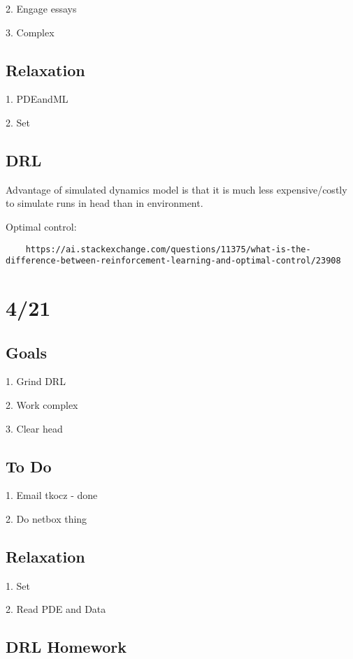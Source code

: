 \documentclass[11pt]{article}
\theoremstyle{remark}
\begin{document}
2. Engage essays

3. Complex

\subsection{Relaxation}

1. PDEandML

2. Set

\subsection{DRL}

Advantage of simulated dynamics model is that it is much less expensive/costly to simulate runs in head than in environment.

Optimal control:

\begin{verbatim}
	https://ai.stackexchange.com/questions/11375/what-is-the-difference-between-reinforcement-learning-and-optimal-control/23908
\end{verbatim}

\section{4/21}

\subsection{Goals}

1. Grind DRL

2. Work complex

3. Clear head

\subsection{To Do}

1. Email tkocz - done

2. Do netbox thing

\subsection{Relaxation}

1. Set 

2. Read PDE and Data

\subsection{DRL Homework}
\end{document}
